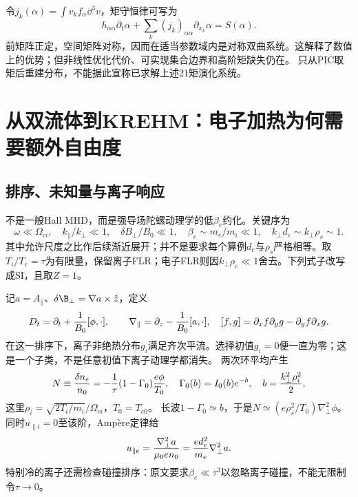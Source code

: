令$j_k(\alpha)=\int v_kf_\alpha\dd^3v$，矩守恒律可写为
\begin{equation}
 h_{\alpha\alpha}\partial_t\alpha+
 \sum_k(j_k)_{\alpha\alpha}\partial_{x_k}\alpha=S(\alpha).
\end{equation}
前矩阵正定，空间矩阵对称，因而在适当参数域内是对称双曲系统。这解释了数值上的优势；但非线性优化代价、可实现集合边界和高阶矩缺失仍在。
\citet{E553}只从PIC取矩后重建分布，不能据此宣称已求解上述21矩演化系统。

\section{从双流体到KREHM：电子加热为何需要额外自由度}
\subsection{排序、未知量与离子响应}
\citet{E512}不是一般Hall MHD，而是强导场陀螺动理学的低$\beta_e$约化。关键序为
\begin{equation}
 \omega\ll\Omega_{ci},\quad k_\parallel/k_\perp\ll1,\quad
 \delta B_\perp/B_0\ll1,\quad \beta_e\sim m_e/m_i\ll1,
 \quad k_\perp d_e\sim k_\perp\rho_s\sim1.
\end{equation}
其中允许尺度之比作后续渐近展开；并不是要求每个算例$d_e$与$\rho_s$严格相等。取$T_i/T_e=\tau$为有限量，保留离子FLR；电子FLR则因$k_\perp\rho_e\ll1$舍去。下列式子改写成SI，且取$Z=1$。

记$a=A_\parallel$、$\delta\B_\perp=\nabla a\times\hat z$，定义
\begin{equation}
 D_t=\partial_t+{1\over B_0}[\phi,\cdot],\qquad
 \nabla_\parallel=\partial_z-{1\over B_0}[a,\cdot],\quad
 [f,g]=\partial_xf\partial_yg-\partial_yf\partial_xg.
\end{equation}
在这一排序下，离子非绝热分布$g_i$满足齐次平流。选择初值$g_i=0$便一直为零；这是一个子类，不是任意初值下离子动理学都消失。
两次环平均产生
\begin{equation}
 N\equiv{\delta n_e\over n_0}=-{1\over\tau}(1-\Gamma_0){e\phi\over T_0},\quad
 \Gamma_0(b)=I_0(b)e^{-b},\quad b={k_\perp^2\rho_i^2\over2},
 \label{eq:selected-quasi}
\end{equation}
这里$\rho_i=\sqrt{2T_i/m_i}/\Omega_{ci}$，$T_0=T_{e0}$。
长波$1-\Gamma_0\simeq b$，于是$N\simeq(e\rho_s^2/T_0)\nabla_\perp^2\phi$。
同时$u_{\parallel i}=0$至该阶，Ampère定律给
\begin{equation}
 u_{\parallel e}={\nabla_\perp^2a\over\mu_0en_0}
 ={e d_e^2\over m_e}\nabla_\perp^2a.
\end{equation}
特别冷的离子还需检查碰撞排序：原文要求$\beta_e\ll\tau^3$以忽略离子碰撞，不能无限制令$\tau\to0$。

